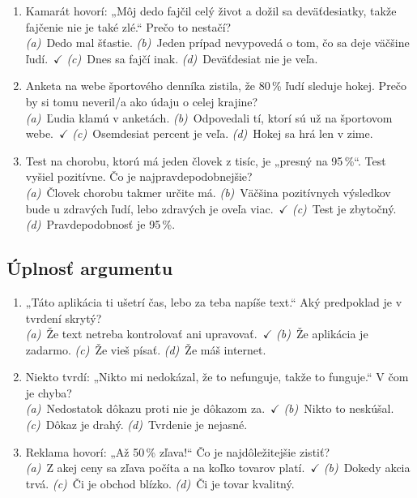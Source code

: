 \begin{enumerate}[nosep, label=K\arabic*., start=7]
    \item Kamarát hovorí: „Môj dedo fajčil celý život a dožil sa deväťdesiatky, takže fajčenie nie je také zlé.“ Prečo to nestačí?\\
    \textit{(a)}~Dedo mal šťastie. \quad \textit{(b)}~Jeden prípad nevypovedá o tom, čo sa deje väčšine ľudí.~$\checkmark$ \quad \textit{(c)}~Dnes sa fajčí inak. \quad \textit{(d)}~Deväťdesiat nie je veľa.

    \item Anketa na webe športového denníka zistila, že 80\,\% ľudí sleduje hokej. Prečo by si tomu neveril/a ako údaju o celej krajine?\\
    \textit{(a)}~Ľudia klamú v anketách. \quad \textit{(b)}~Odpovedali tí, ktorí sú už na športovom webe.~$\checkmark$ \quad \textit{(c)}~Osemdesiat percent je veľa. \quad \textit{(d)}~Hokej sa hrá len v zime.

    \item Test na chorobu, ktorú má jeden človek z tisíc, je „presný na 95\,\%“. Test vyšiel pozitívne. Čo je najpravdepodobnejšie?\\
    \textit{(a)}~Človek chorobu takmer určite má. \quad \textit{(b)}~Väčšina pozitívnych výsledkov bude u zdravých ľudí, lebo zdravých je oveľa viac.~$\checkmark$ \quad \textit{(c)}~Test je zbytočný. \quad \textit{(d)}~Pravdepodobnosť je 95\,\%.
\end{enumerate}

\subsection*{Úplnosť argumentu}

\begin{enumerate}[nosep, label=K\arabic*., start=10]
    \item „Táto aplikácia ti ušetrí čas, lebo za teba napíše text.“ Aký predpoklad je v tvrdení skrytý?\\
    \textit{(a)}~Že text netreba kontrolovať ani upravovať.~$\checkmark$ \quad \textit{(b)}~Že aplikácia je zadarmo. \quad \textit{(c)}~Že vieš písať. \quad \textit{(d)}~Že máš internet.

    \item Niekto tvrdí: „Nikto mi nedokázal, že to nefunguje, takže to funguje.“ V čom je chyba?\\
    \textit{(a)}~Nedostatok dôkazu proti nie je dôkazom za.~$\checkmark$ \quad \textit{(b)}~Nikto to neskúšal. \quad \textit{(c)}~Dôkaz je drahý. \quad \textit{(d)}~Tvrdenie je nejasné.

    \item Reklama hovorí: „Až 50\,\% zľava!“ Čo je najdôležitejšie zistiť?\\
    \textit{(a)}~Z akej ceny sa zľava počíta a na koľko tovarov platí.~$\checkmark$ \quad \textit{(b)}~Dokedy akcia trvá. \quad \textit{(c)}~Či je obchod blízko. \quad \textit{(d)}~Či je tovar kvalitný.
\end{enumerate}

